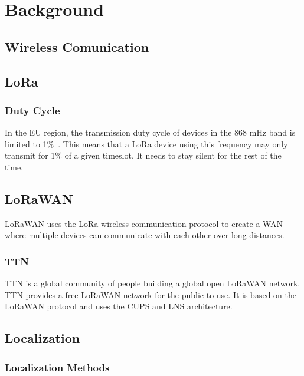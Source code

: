 \chapter{Background}

\section{Wireless Comunication}
\section{\acf{LoRa}}


\subsection{Duty Cycle}


In the \ac{EU} region, the transmission duty cycle of devices in the 868 mHz band is limited to 1\%~\cite{etsi_etsi_2012}.
This means that a \ac{LoRa} device using this frequency may only transmit for 1\% of a given timeslot.
It needs to stay silent for the rest of the time.

\section{\acf{LoRaWAN}}

\ac{LoRaWAN} uses the LoRa wireless communication protocol to create a \ac{WAN} where multiple devices can communicate with each other over long distances.

\subsection{\acf{TTN}}

\ac{TTN} is a global community of people building a global open \ac{LoRaWAN} network. \ac{TTN} provides a free \ac{LoRaWAN} network for the public to use. It is based on the \ac{LoRaWAN} protocol and uses the \ac{CUPS} and \ac{LNS} architecture.


\section{Localization}

\subsection{Localization Methods}

